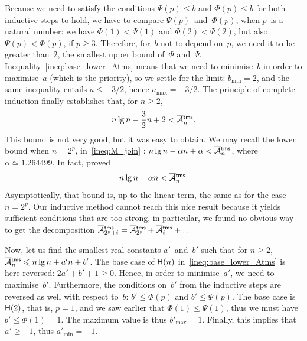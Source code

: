 Because we need to satisfy the conditions \(\Psi(p) \leqslant b\) and
\(\Phi(p) \leqslant b\) for both inductive steps to hold, we have to
compare \(\Psi(p)\)~and~\(\Phi(p)\), when \(p\)~is a natural number:
we have \(\Phi(1) < \Psi(1)\) and \(\Phi(2) < \Psi(2)\), but also
\(\Psi(p) < \Phi(p)\), if \(p \geqslant 3\). Therefore, for~\(b\) not
to depend on~\(p\), we need it to be greater than~\(2\), the smallest
upper bound of~\(\Phi\)
and~\(\Psi\). Inequality~\eqref{ineq:base_lower_Atms} means that we
need to minimise~\(b\) in order to maximise~\(a\) (which is the
priority), so we settle for the limit: \(b_{\min} = 2\), and the same
inequality entails \(a \leqslant -3/2\), hence \(a_{\max} =
-3/2\). The principle of complete induction finally establishes that,
for \(n \geqslant 2\),
\begin{equation}
  n\lg n - \frac{3}{2} n + 2 < \OM{\fun{tms}}{n}.
\label{ineq:lower_Atms}
\end{equation}
This bound is not very good, but it was easy to obtain. We may recall
the lower bound when \(n=2^p\), in~\eqref{ineq:M_join}
: \(n\lg n - \alpha n + \alpha <
\OM{\fun{tms}}{n}\), where \(\alpha \simeq 1.264499\). In fact,
\cite{FlajoletGolin_1994} proved
\begin{equation}
n\lg n - \alpha n < \OM{\fun{tms}}{n}.
\label{ineq:best_lower_Atms}
\end{equation}
Asymptotically, that bound is, up to the linear term, the same as for
the case \(n=2^p\). Our inductive method cannot reach this nice result
because it yields sufficient conditions that are too strong, in
particular, we found no obvious way to get the decomposition
\(\OM{\fun{tms}}{2^p+i} = \OM{\fun{tms}}{2^p} + \OM{\fun{tms}}{i} +
\dots\)

Now, let us find the smallest real constants \(a'\)~and~\(b'\) such
that for \(n \geqslant 2\), \(\OM{\fun{tms}}{n} \leqslant n\lg n + a'n
+ b'\). The base case of \(\textsf{H}({n})\)
in~\eqref{ineq:base_lower_Atms} is here reversed: \(2a' + b' + 1
\geqslant 0\). Hence, in order to minimise~\(a'\), we need to
maximise~\(b'\). Furthermore, the conditions on~\(b'\) from the
inductive steps are reversed as well with respect to~\(b\): \(b'
\leqslant \Phi(p)\) and \(b' \leqslant \Psi(p)\). The base case is
\(\textsf{H}({2})\), that is, \(p=1\), and we saw earlier that \(\Phi(1)
\leqslant \Psi(1)\), thus we must have \(b'\leqslant \Phi(1) =
1\). The maximum value is thus \(b'_{\max} = 1\). Finally, this
implies that \(a'\geqslant -1\), thus \(a'_{\min} = -1\).

